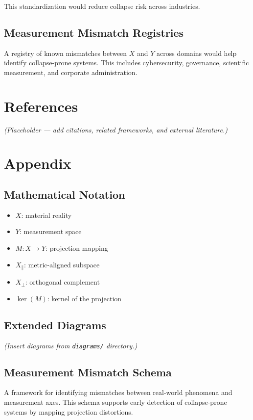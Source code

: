 \documentclass[11pt]{article}
\begin{document}
This standardization would reduce collapse risk across industries.

\subsection{Measurement Mismatch Registries}

A registry of known mismatches between $X$ and $Y$ across domains would help identify collapse-prone systems.
This includes cybersecurity, governance, scientific measurement, and corporate administration.

\section{References}

\textit{(Placeholder --- add citations, related frameworks, and external literature.)}

\appendix
\section{Appendix}

\subsection{Mathematical Notation}

\begin{itemize}[leftmargin=1.5em]
    \item $X$: material reality
    \item $Y$: measurement space
    \item $M : X \rightarrow Y$: projection mapping
    \item $X_{\parallel}$: metric-aligned subspace
    \item $X_{\perp}$: orthogonal complement
    \item $\ker(M)$: kernel of the projection
\end{itemize}

\subsection{Extended Diagrams}

\textit{(Insert diagrams from \texttt{diagrams/} directory.)}

\subsection{Measurement Mismatch Schema}

A framework for identifying mismatches between real-world phenomena and measurement axes.
This schema supports early detection of collapse-prone systems by mapping projection distortions.
\end{document}
